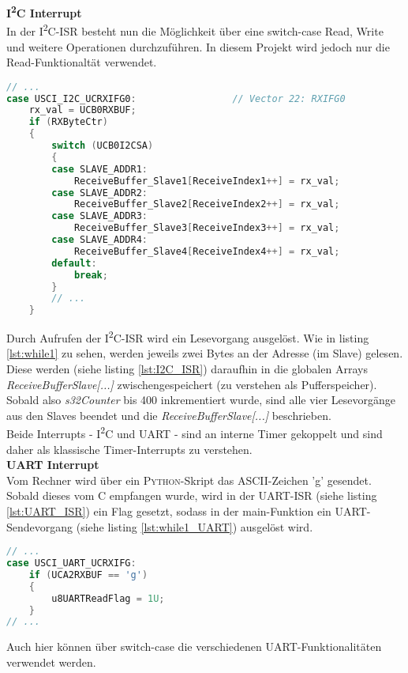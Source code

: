 \documentclass[
	letterpaper, %
	10pt, %
]{CSUniSchoolLabReport}
\begin{document}
\begin{spacing}{1.6}
\textbf{I\textsuperscript{2}C Interrupt}\\
In der I\textsuperscript{2}C-ISR besteht nun die Möglichkeit über eine switch-case Read, Write und weitere Operationen durchzuführen. In diesem Projekt wird jedoch nur die Read-Funktionaltät verwendet. 
\begin{lstlisting}[caption={Auszug aus I\textsuperscript{2}C-ISR - Projekt \glqq Kraftsensor\grqq},label={lst:I2C_ISR},language=C]
// ...
case USCI_I2C_UCRXIFG0:                 // Vector 22: RXIFG0
    rx_val = UCB0RXBUF;
    if (RXByteCtr)
    {
        switch (UCB0I2CSA)
        {
        case SLAVE_ADDR1:
            ReceiveBuffer_Slave1[ReceiveIndex1++] = rx_val;
        case SLAVE_ADDR2:
            ReceiveBuffer_Slave2[ReceiveIndex2++] = rx_val;
        case SLAVE_ADDR3:
            ReceiveBuffer_Slave3[ReceiveIndex3++] = rx_val;
        case SLAVE_ADDR4:
            ReceiveBuffer_Slave4[ReceiveIndex4++] = rx_val;
        default:
            break;
        }
        // ...
    }
\end{lstlisting}
Durch Aufrufen der I\textsuperscript{2}C-ISR wird ein Lesevorgang ausgelöst. Wie in listing \ref{lst:while1} zu sehen, werden jeweils zwei Bytes an der Adresse (im Slave) gelesen. Diese werden (siehe listing \ref{lst:I2C_ISR}) daraufhin in die globalen Arrays \textit{ReceiveBuffer\textunderscore Slave[...]} zwischengespeichert (zu verstehen als Pufferspeicher). Sobald also \textit{s32Counter} bis 400 inkrementiert wurde, sind alle vier Lesevorgänge aus den Slaves beendet und die \textit{ReceiveBuffer\textunderscore Slave[...]} beschrieben.\\

Beide Interrupts - I\textsuperscript{2}C und UART - sind an interne Timer gekoppelt und sind daher als klassische Timer-Interrupts zu verstehen.\\

\textbf{UART Interrupt}\\
Vom Rechner wird über ein \textsc{Python}-Skript das ASCII-Zeichen 'g' gesendet. Sobald dieses vom \textmu C empfangen wurde, wird in der UART-ISR (siehe listing \ref{lst:UART_ISR}) ein Flag gesetzt, sodass in der main-Funktion ein UART-Sendevorgang (siehe listing \ref{lst:while1_UART}) ausgelöst wird.
\begin{lstlisting}[caption={Auszug aus UART-ISR - Projekt \glqq Kraftsensor\grqq},label={lst:UART_ISR},language=C]
// ...
case USCI_UART_UCRXIFG:
    if (UCA2RXBUF == 'g')
    {
        u8UARTReadFlag = 1U;
    }
// ...
\end{lstlisting}
Auch hier können über switch-case die verschiedenen UART-Funktionalitäten verwendet werden. 


\end{spacing}
\end{document}
